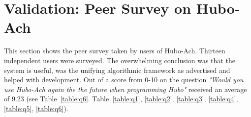 \chapter{Validation: Peer Survey on Hubo-Ach}\label{sec:hubo-achSurvey}
	This section shows the peer survey taken by users of Hubo-Ach.
	Thirteen independent users were surveyed.
	The overwhelming conclusion was that the system is useful, was the unifying algorithmic framework as advertised and helped with development.
	Out of a score from 0-10 on the question \textit{"Would you use Hubo-Ach again the the future when programming Hubo"} received an average of 9.23 (see Table~\ref{table:q6}.
	Table~\ref{table:q1}, \ref{table:q2}, \ref{table:q3}, \ref{table:q4}, \ref{table:q5}, \ref{table:q6}).

	
	
	
	
	
	